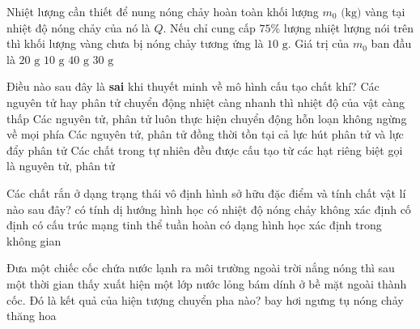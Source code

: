 \begin{ex}	Nhiệt lượng cần thiết để nung nóng chảy hoàn toàn khối lượng $m_0\text{ (kg)}$ vàng tại nhiệt độ nóng chảy của nó là $Q$. Nếu chỉ cung cấp $75\%$ lượng nhiệt lượng nói trên thì khối lượng vàng chưa bị nóng chảy tương ứng là $10\text{ g}$. Giá trị của $m_0$ ban đầu là
	\choice
	{$20\text{ g}$}
	{$10\text{ g}$}
	{\True $40\text{ g}$}
	{$30\text{ g}$}
\end{ex}

\begin{ex}	Điều nào sau đây là \textbf{sai} khi thuyết minh về mô hình cấu tạo chất khí?
	\choice
	{\True Các nguyên tử hay phân tử chuyển động nhiệt càng nhanh thì nhiệt độ của vật càng thấp}
	{Các nguyên tử, phân tử luôn thực hiện chuyển động hỗn loạn không ngừng về mọi phía}
	{Các nguyên tử, phân tử đồng thời tồn tại cả lực hút phân tử và lực đẩy phân tử}
	{Các chất trong tự nhiên đều được cấu tạo từ các hạt riêng biệt gọi là nguyên tử, phân tử}
\end{ex}

\begin{ex}	Các chất rắn ở dạng trạng thái vô định hình sở hữu đặc điểm và tính chất vật lí nào sau đây?
	\choice
	{có tính dị hướng hình học}
	{\True có nhiệt độ nóng chảy không xác định cố định}
	{có cấu trúc mạng tinh thể tuần hoàn}
	{có dạng hình học xác định trong không gian}
\end{ex}

\begin{ex}	Đưa một chiếc cốc chứa nước lạnh ra môi trường ngoài trời nắng nóng thì sau một thời gian thấy xuất hiện một lớp nước lỏng bám dính ở bề mặt ngoài thành cốc. Đó là kết quả của hiện tượng chuyển pha nào?
	\choice
	{bay hơi}
	{\True ngưng tụ}
	{nóng chảy}
	{thăng hoa}
\end{ex}

